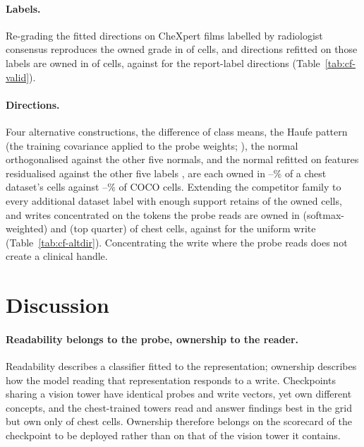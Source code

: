 \documentclass{article}
\begin{document}
\paragraph{Labels.} Re-grading the fitted directions on \cfValidRows{} CheXpert films labelled by radiologist consensus \citep{irvin2019chexpert} reproduces the owned grade in \cfValidOwnedAgree{} of \cfValidCells{} cells, and directions refitted on those labels are owned in \cfValidfitOwnedExpert{} of \cfValidfitCells{} cells, against \cfValidfitOwnedReport{} for the report-label directions (Table~\ref{tab:cf-valid}).

\paragraph{Directions.} Four alternative constructions, the difference of class means, the Haufe pattern (the training covariance applied to the probe weights; \citealp{haufe2014interpretation}), the normal orthogonalised against the other five normals, and the normal refitted on features residualised against the other five labels \citep{nicolson2025explaining}, are each owned in \cfAltdirChestPctMin{}--\cfAltdirChestPctMax\% of a chest dataset's cells against \cfAltdirCocoPctMin{}--\cfAltdirCocoPctMax\% of COCO cells. Extending the competitor family to every additional dataset label with enough support retains \cfExtcompRetained{} of the \cfExtcompOwned{} owned cells, and writes concentrated on the tokens the probe reads are owned in \cfTokenwSoftChestOwned{} (softmax-weighted) and \cfTokenwTopqChestOwned{} (top quarter) of \cfTokenwChestCells{} chest cells, against \cfTokenwUniformChestOwned{} for the uniform write (Table~\ref{tab:cf-altdir}). Concentrating the write where the probe reads does not create a clinical handle.

\FloatBarrier
\section{Discussion}
\label{sec:implications}

\paragraph{Readability belongs to the probe, ownership to the reader.}
Readability describes a classifier fitted to the representation; ownership describes how the model reading that representation responds to a write. Checkpoints sharing a vision tower have identical probes and write vectors, yet own different concepts, and the chest-trained towers read and answer findings best in the grid but own only \cfSpecTowerOwned{} of \cfSpecTowerN{} chest cells. Ownership therefore belongs on the scorecard of the checkpoint to be deployed rather than on that of the vision tower it contains.
\end{document}
